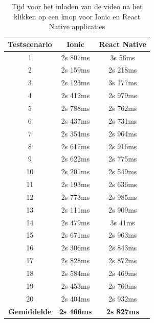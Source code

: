 

\begin{table}[htbp]
  \centering
  \begin{tabular}{|c|c|c|}
  \hline
  \textbf{Testscenario} & \textbf{Ionic} & \textbf{React Native} \\
  \hline
  1 & 2s 807ms & 3s 56ms \\
  \hline
  2 & 2s 159ms & 2s 218ms \\
  \hline
  3 & 2s 123ms & 3s 177ms \\
  \hline
  4 & 2s 412ms & 2s 979ms \\
  \hline
  5 & 2s 788ms & 2s 762ms \\
  \hline
  6 & 2s 437ms & 2s 731ms \\
  \hline
  7 & 2s 354ms & 2s 964ms \\
  \hline
  8 & 2s 617ms & 2s 916ms \\
  \hline
  9 & 2s 622ms & 2s 775ms \\
  \hline
  10 & 2s 201ms & 2s 549ms \\
  \hline
  11 & 2s 193ms & 2s 636ms \\
  \hline
  12 & 2s 773ms & 2s 985ms \\
  \hline
  13 & 2s 111ms & 2s 909ms \\
  \hline
  14 & 2s 479ms & 3s 41ms \\
  \hline
  15 & 2s 671ms & 2s 963ms \\
  \hline
  16 & 2s 306ms & 2s 843ms \\
  \hline
  17 & 2s 828ms & 2s 872ms \\
  \hline
  18 & 2s 584ms & 2s 469ms \\
  \hline
  19 & 2s 453ms & 2s 760ms \\
  \hline
  20 & 2s 404ms & 2s 932ms \\
  \hline
  \textbf{Gemiddelde} & \textbf{2s 466ms} & \textbf{2s 827ms} \\
  \hline
  \end{tabular}
  \caption{Tijd voor het inladen van de video na het klikken op een knop voor Ionic en React Native applicaties}
  \label{tab:warm_startup}
\end{table}


